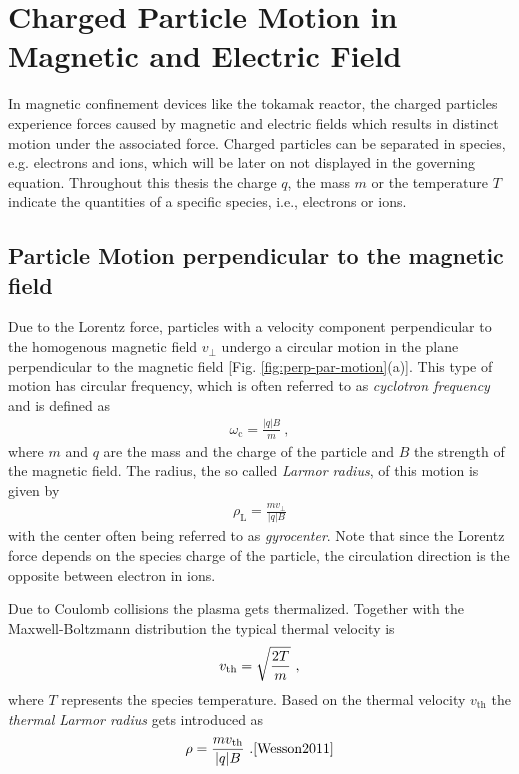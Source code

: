 \section{Charged Particle Motion in Magnetic and Electric Field}
\label{sec:motion}

In magnetic confinement devices like the tokamak reactor, the charged particles experience forces caused by magnetic and electric fields which results in distinct motion under the associated force. Charged particles can be separated in species, e.g. electrons and ions, which will be later on not displayed in the governing equation. Throughout this thesis the charge $q$, the mass $m$ or the temperature $T$ indicate the quantities of a specific species, i.e., electrons or ions.

\subsection{Particle Motion perpendicular to the magnetic field}
\label{sub:gyromotion}

Due to the Lorentz force, particles with a velocity component perpendicular to the homogenous magnetic field $v_{\perp}$ undergo a circular motion in the plane perpendicular to the magnetic field [Fig. \ref{fig:perp-par-motion}(a)]. This type of motion has circular frequency, which is often referred to as \textit{cyclotron frequency} and is defined as
\begin{gather}
    \omega_\mathrm{c} = \frac{|q|B}{m}~,
\end{gather}
where $m$ and $q$ are the mass and the charge of the particle and $B$ the strength of the magnetic field. The radius, the so called \textit{Larmor radius}, of this motion is given by
\begin{gather}
    \rho_\mathrm{L} = \frac{mv_{\perp}}{|q|B}
\end{gather}
with the center often being referred to as \textit{gyrocenter}. Note that since the Lorentz force depends on the species charge of the particle, the circulation direction is the opposite between electron in ions.\\\bigskip

Due to Coulomb collisions the plasma gets thermalized. Together with the Maxwell-Boltzmann distribution the typical thermal velocity is
\begin{gather}
    v_{\mathrm{th}} = \sqrt{\frac{2T}{m}}~,
\end{gather}
where $T$ represents the species temperature. Based on the thermal velocity $v_\mathrm{th}$ the \textit{thermal Larmor radius} gets introduced as
\begin{gather}
    \rho = \frac{mv_{\mathrm{th}}}{|q|B}~. \cite{Wesson2011}
\end{gather}

